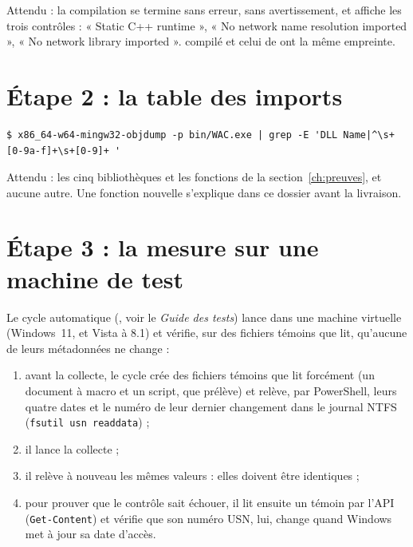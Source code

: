 \documentclass[11pt,a4paper,oneside]{report}
\begin{document}
Attendu : la compilation se termine sans erreur, sans avertissement, et
affiche les trois contrôles : « Static C++ runtime », « No network name
resolution imported », « No network library imported ». 
compilé et celui de  ont la même empreinte.

\section{Étape 2 : la table des imports}

\begin{lstlisting}
$ x86_64-w64-mingw32-objdump -p bin/WAC.exe | grep -E 'DLL Name|^\s+[0-9a-f]+\s+[0-9]+ '
\end{lstlisting}

Attendu : les cinq bibliothèques et les fonctions de la
section~\ref{ch:preuves}, et aucune autre. Une fonction nouvelle
s'explique dans ce dossier avant la livraison.

\section{Étape 3 : la mesure sur une machine de test}

Le cycle automatique (, voir le \emph{Guide des
tests}) lance \wac{} dans une machine virtuelle (Windows~11, et Vista à 8.1) et vérifie, sur des
fichiers témoins que \wac{} lit, qu'aucune de leurs métadonnées ne change :

\begin{enumerate}
  \item avant la collecte, le cycle crée des fichiers témoins que \wac{} lit
        forcément (un document à macro et un script, que 
        prélève) et relève, par PowerShell, leurs quatre dates et le numéro
        de leur dernier changement dans le journal NTFS
        (\texttt{fsutil usn readdata}) ;
  \item il lance la collecte ;
  \item il relève à nouveau les mêmes valeurs : elles doivent être identiques ;
  \item pour prouver que le contrôle sait échouer, il lit ensuite un témoin
        par l'API (\texttt{Get-Content}) et vérifie que son numéro USN, lui,
        change quand Windows met à jour sa date d'accès.
\end{enumerate}
\end{document}
